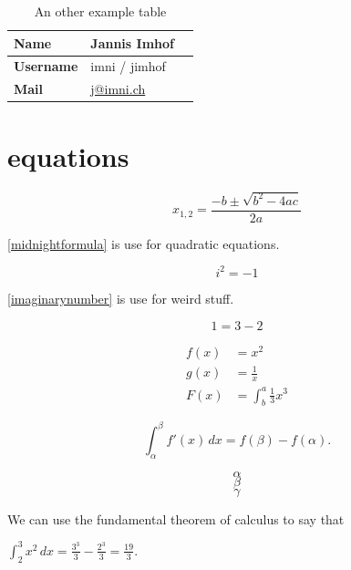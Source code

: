 \documentclass{scrreprt}
\begin{document}
\begin{table}[h]
    \centering
    \begin{tabularx}{\textwidth}{lll}
        
        \hline
        \textbf{Name} & Jannis Imhof
        \\ \hline
        \textbf{Username} & imni / jimhof
        \\ \hline
        \textbf{Mail} & \href{mailto:j@imni.ch}{j@imni.ch}
        \\ \hline

    \end{tabularx}
    \caption{An other example table}
    \label{tbl:otherexample}
\end{table}


\lipsum[2-5]

\section{equations}

\begin{equation}
x_{1,2}=\frac{-b\pm\sqrt{b^2-4ac}}{2a}
\label{midnightformula}
\end{equation}

\autoref{midnightformula} is use for quadratic equations.

\begin{equation}
    i^2 = -1
\label{imaginarynumber}
\end{equation}

\autoref{imaginarynumber} is use for weird stuff.

\begin{equation}
  1 = 3 - 2
\end{equation}

\begin{align}
  f(x) &= x^2
    \\
  g(x) &= \frac{1}{x}
    \\
  F(x) &= \int^a_b \frac{1}{3}x^3
\end{align}

\begin{equation}
	\int_\alpha^\beta f'(x) \, dx=f(\beta)-f(\alpha).
\end{equation}

\[ \alpha \]
\[ \beta \]
\[ \gamma \]

We can use the fundamental theorem of calculus to say that

 $\int_2^3 x^2 \, dx=\frac{3^3}{3}-\frac{2^3}{3}=\frac{19}{3}$.  
\end{document}
